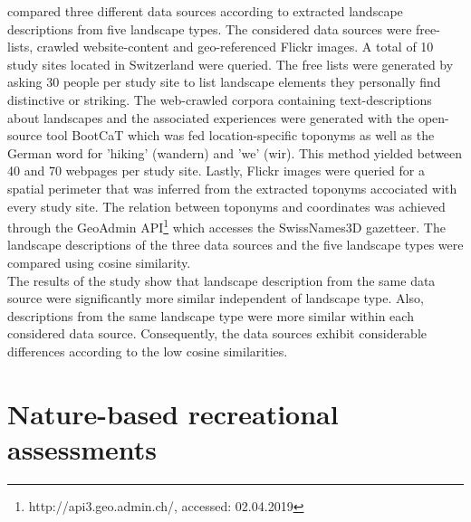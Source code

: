 \textcite{Wartmann2018} compared three different data sources according to extracted landscape descriptions from five landscape types. The considered data sources were free-lists, crawled website-content and geo-referenced Flickr images. A total of 10 study sites located in Switzerland were queried. The free lists were generated by asking 30 people per study site to list landscape elements they personally find distinctive or striking. The web-crawled corpora containing text-descriptions about landscapes and the associated experiences were generated with the open-source tool BootCaT \parencite{Baroni2004} which was fed location-specific toponyms as well as the German word for 'hiking' (wandern) and 'we' (wir). This method yielded between 40 and 70 webpages per study site. Lastly, Flickr images were queried for a spatial perimeter that was inferred from the extracted toponyms accociated with every study site. The relation between toponyms and coordinates was achieved through the GeoAdmin API\footnote{http://api3.geo.admin.ch/, accessed: 02.04.2019} which accesses the SwissNames3D gazetteer. The landscape descriptions of the three data sources and the five landscape types were compared using cosine similarity. \\ 
The results of the study show that landscape description from the same data source were significantly more similar independent of landscape type. Also, descriptions from the same landscape type were more similar within each considered data source. Consequently, the data sources exhibit considerable differences according to the low cosine similarities.


\section{Nature-based recreational assessments}

